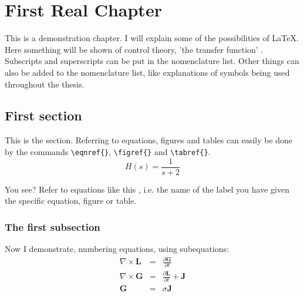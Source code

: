     \chapter{First Real Chapter}

    This is a demonstration chapter. I will explain some of the possibilities of \LaTeX. Here something will be shown of control theory, 'the transfer function' . Subscripts and superscripts can be put in the nomenclature  list.   Other things can also be added to the nomenclature list, like explanations of symbols being used throughout the thesis.  

        \section{First section}

        This is the section. Referring to equations, figures and tables can easily be done by the commands \verb"\eqnref{}",
        \verb"\figref{}" and \verb"\tabref{}".
        \begin{equation}\label{eq:First}
        H(s) = \frac{1}{s+2}
        \end{equation}

        You see? Refer to equations like this , i.e. the name of the label you have given the specific equation, figure or table.
        
        \subsection{The first subsection}
  
        Now I demonstrate, numbering equations, using subequations:
	  \begin{subequations}
		\begin{eqnarray}
    \label{2eq1d1}
	  \nabla\times\mathbf{L}  &=& \frac{\partial\mathbf{G}}{\partial t} \\
    \label{2eq1d2}
  	\nabla\times\mathbf{G}  &=& \frac{\partial\mathbf{L}}{\partial t} + \mathbf{J} \\
    \label{2eq1d3}
    \mathbf{G}              &=& \sigma\mathbf{J}
		\end{eqnarray}
			  \end{subequations}
	
